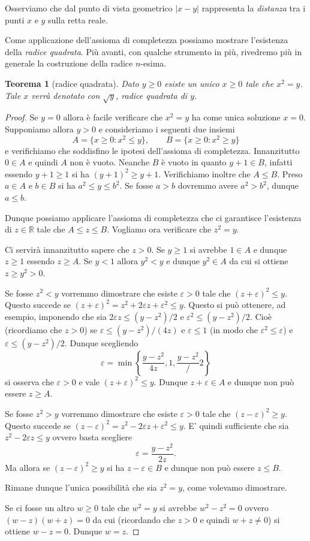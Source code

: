 \documentclass[italian,a4paper,oneside,headinclude]{scrbook}
\newcommand{\mymargin}[1]{\marginpar{#1}\index{#1}}
\newcommand{\myemph}[1]{\emph{#1}\marginpar{#1}\index{#1}}
\newcommand{\eps}{\varepsilon}
\newcommand{\RR}{\mathbb R}
\newcommand{\abs}[1]{{\left|#1\right|}}
\newtheorem{theorem}{Teorema}
\begin{document}
Osserviamo che dal punto di vista geometrico
$\abs{x-y}$ rappresenta la \emph{distanza} tra i punti
$x$ e $y$ sulla retta reale.

Come applicazione dell'assioma di completezza possiamo mostrare l'esistenza
della \myemph{radice quadrata}.
Più avanti, con qualche strumento in più, rivedremo più in generale
la costruzione della radice $n$-esima.

\begin{theorem}[radice quadrata]
Dato $y\ge 0$ esiste un unico $x\ge 0$ tale che $x^2=y$.
Tale $x$ verrà denotato con $\sqrt y$, \emph{radice quadrata} di $y$.
\mymargin{$\sqrt{\cdot}$}
\end{theorem}
\begin{proof}
Se $y=0$ allora è facile verificare che $x^2=y$ ha come unica soluzione $x=0$.
Supponiamo allora $y>0$ e
consideriamo i seguenti due insiemi
\[
  A = \{x\ge 0 \colon x^2 \le y\},\qquad
  B = \{x\ge 0 \colon x^2 \ge y\}
\]
e verifichiamo che soddisfino le ipotesi dell'assioma di completezza.
Innanzitutto $0\in A$ e quindi $A$ non è vuoto.
Neanche $B$ è vuoto in quanto $y+1\in B$,
infatti essendo $y+1\ge 1$ si ha
$(y+1)^2 \ge y+1$. Verifichiamo inoltre che $A \le B$.
Preso $a\in A$ e $b\in B$ si ha $a^2 \le y \le b^2$.
Se fosse $a>b$ dovremmo avere $a^2>b^2$, dunque $a \le b$.

Dunque possiamo applicare l'assioma di completezza
che ci garantisce l'esistenza di $z\in \RR$ tale che $A \le z \le B$.
Vogliamo ora verificare che $z^2 = y$.

Ci servirà innanzitutto sapere che $z>0$. Se $y\ge 1$ si avrebbe $1\in A$
e dunque $z\ge 1$ essendo $z\ge A$. Se $y<1$ allora $y^2 < y$ e dunque $y^2 \in A$
da cui si ottiene $z\ge y^2 > 0$.

Se fosse $z^2 < y$ vorremmo dimostrare che esiste $\eps>0$ tale che
$(z+\eps)^2 \le y$.
Questo succede se $(z+\eps)^2 = z^2 + 2 \eps z + \eps^2 \le y$.
Questo si può ottenere, ad esempio,
imponendo che sia $2\eps z \le (y-z^2)/2$ e $\eps^2 \le (y-z^2)/2$.
Cioè (ricordiamo che $z>0$) se $\eps \le (y-z^2)/(4z)$ e $\eps \le 1$
(in modo che $\eps^2 \le \eps$)
e $\eps \le (y-z^2)/2$. Dunque scegliendo
\[
\eps = \min\left\{ \frac{y-z^2}{4z}, 1, \frac{y-z^2}/2\right\}
\]
si osserva che $\eps>0$ e vale $(z+\eps)^2\le y$.
Dunque $z+\eps \in A$ e dunque non può essere $z\ge A$.

Se fosse $z^2 > y$ vorremmo dimostrare che esiste $\eps>0$ tale che
$(z-\eps)^2 \ge y$.
Questo succede se $(z-\eps)^2 = z^2 - 2\eps z + \eps^2 \le y$.
E' quindi sufficiente che sia $z^2 - 2 \eps z \le y$ ovvero basta scegliere
\[
  \eps = \frac{y-z^2}{2z}.
\]
Ma allora se $(z-\eps)^2\ge y$ si ha $z-\eps \in B$ e dunque non può
essere $z \le B$.

Rimane dunque l'unica possibilità che sia $z^2 = y$, come volevamo dimostrare.

Se ci fosse un altro $w\ge 0$ tale che $w^2 = y$ si avrebbe $w^2 - z^2=0$ ovvero
$(w-z)(w+z)=0$ da cui (ricordando che $z>0$ e quindi $w+z\neq 0$)
si ottiene $w-z=0$. Dunque $w=z$.
\end{proof}
\end{document}
